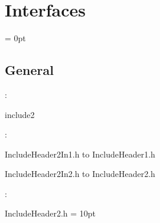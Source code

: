 
\section{Interfaces} 


\parskip = 0pt

\vspace{3mm} \subsection*{General}

: 

include2
\vspace{2mm}

\vspace{5mm}

: 



IncludeHeader2In1.h to IncludeHeader1.h

IncludeHeader2In2.h to IncludeHeader2.h
\vspace{2mm}

: 

IncludeHeader2.h
\vspace{2mm}\parskip = 10pt 
